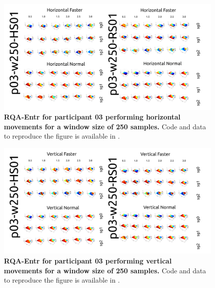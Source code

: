 \documentclass[12pt]{article}
\begin{document}
\newpage
\begin{figure}[ht!]
\centering
\includegraphics{figures/rqa/output/epsilons/rqa-epsilonsp03w250Horizontal}
    	\caption{
	{\bf RQA-Entr for participant 03 performing horizontal movements for a window size of 250 samples.}
	Code and data to reproduce the figure is available in \cite{srep2020}.
        }
    \label{fig-p03-H-w250}
\end{figure}
\begin{figure}[hb!]
\centering
\includegraphics{figures/rqa/output/epsilons/rqa-epsilonsp03w250Vertical}
    	\caption{
	{\bf RQA-Entr for participant 03 performing vertical movements for a window size of 250 samples.}
	Code and data to reproduce the figure is available in \cite{srep2020}.
        }
    \label{fig-p03-V-w250}
\end{figure}
\end{document}
